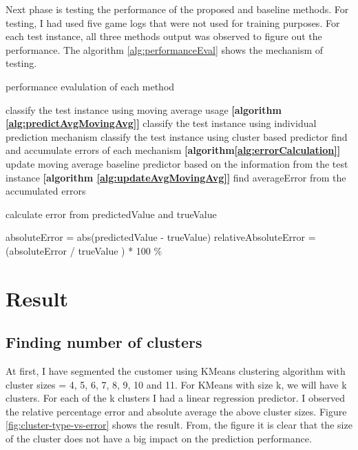 Next phase is testing the performance of the proposed and baseline methods. For testing, I had used five game logs that were not used for training purposes. For each test instance, all three methods output was observed to figure out the performance. The algorithm \ref{alg:performanceEval} shows the mechanism of testing.

\begin{algorithm}
\caption{performance evalulation of each method}
\begin{algorithmic} [1]
	\STATE classify the test instance using moving average usage \textbf{[algorithm \ref{alg:predictAvgMovingAvg}]}
	\STATE classify the test instance using individual prediction mechanism
	\STATE classify the test instance using cluster based predictor
	\STATE find and accumulate errors of each mechanism \textbf{[algorithm\ref{alg:errorCalculation}]}
	\STATE update moving average baseline predictor based on the information from the test instance \textbf{[algorithm \ref{alg:updateAvgMovingAvg}]}
\ENDFOR 
\STATE find averageError from the accumulated errors
\end{algorithmic}
\label{alg:performanceEval}
\end{algorithm}

\begin{algorithm} [!h]
\caption{calculate error from predictedValue and trueValue}
\begin{algorithmic} [1]
\STATE absoluteError = abs(predictedValue - trueValue)
\STATE relativeAbsoluteError = (absoluteError / trueValue ) * 100 \%
\end{algorithmic}
\label{alg:errorCalculation}
\end{algorithm}

\section{Result}
\subsection{Finding number of clusters}

At first, I have segmented the customer using KMeans clustering algorithm with cluster sizes = 4, 5, 6, 7, 8, 9, 10 and 11. For KMeans with size k, we will have k clusters. For each of the k clusters I had a linear regression predictor. I observed the relative percentage error and absolute average the above cluster sizes. Figure \ref{fig:cluster-type-vs-error} shows the result. From, the figure it is clear that the size of the cluster does not have a big impact on the prediction performance.

